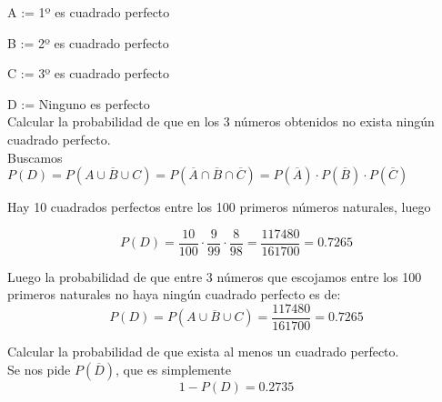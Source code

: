 \problem
A := 1º es cuadrado perfecto

B := 2º es cuadrado perfecto 

C := 3º es cuadrado perfecto 

D := Ninguno es perfecto \\


\subproblem 
Calcular la probabilidad de que en los 3 números obtenidos no exista ningún cuadrado perfecto. \\


Buscamos $P(D) = P(\overline{A\cup B \cup C}) = P(\overline{A}\cap \overline{B} \cap \overline{C}) =  P(\overline{A})\cdot P(\overline{B}) \cdot P(\overline{C})$

Hay 10 cuadrados perfectos entre los 100 primeros números naturales, luego

$$P(D) = \dfrac{10}{100}\cdot \dfrac{9}{99}\cdot\dfrac{8}{98} = \dfrac{117480}{161700} = 0.7265$$


Luego la probabilidad de que entre 3 números que escojamos entre los 100 primeros naturales no haya ningún cuadrado perfecto es de: $$ P(D) = P(\overline{A\cup B \cup C}) = \dfrac{117480}{161700} = 0.7265$$

\subproblem 
Calcular la probabilidad de que exista al menos un cuadrado perfecto.\\
Se nos pide $P(\overline D)$, que es simplemente 
$$1 - P(D) = 0.2735$$

